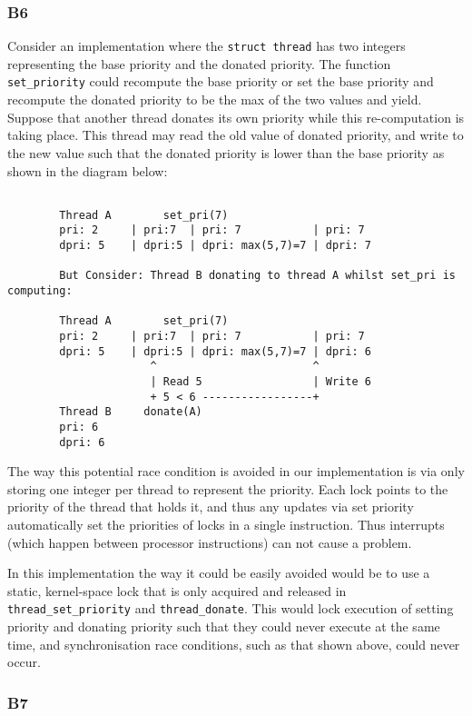 \documentclass[a4wide, 11pt]{article}
\newcommand{\tx}{\texttt}
\begin{document}
\subsubsection{B6}
Consider an implementation where the \tx{struct thread} has two integers representing the base priority and the donated priority. The function \tx{set\_priority} could recompute the base priority or set the base priority and recompute the donated priority to be the max of the two values and yield. Suppose that another thread donates its own priority while this re-computation is taking place. This thread may read the old value of donated priority, and write to the new value such that the donated priority is lower than the base priority as shown in the diagram below:
\begin{verbatim}

        Thread A        set_pri(7)
        pri: 2     | pri:7  | pri: 7           | pri: 7
        dpri: 5    | dpri:5 | dpri: max(5,7)=7 | dpri: 7

        But Consider: Thread B donating to thread A whilst set_pri is computing: 

        Thread A        set_pri(7)
        pri: 2     | pri:7  | pri: 7           | pri: 7
        dpri: 5    | dpri:5 | dpri: max(5,7)=7 | dpri: 6
                      ^                        ^
                      | Read 5                 | Write 6
                      + 5 < 6 -----------------+
        Thread B     donate(A)
        pri: 6
        dpri: 6 
\end{verbatim}    

The way this potential race condition is avoided in our implementation is via only storing one integer per thread to represent the priority. Each lock points to the priority of the thread that holds it, and thus any updates via set priority automatically set the priorities of locks in a single instruction. Thus interrupts (which happen between processor instructions) can not cause a problem.

In this implementation the way it could be easily avoided would be to use a static, kernel-space lock that is only acquired and released in \tx{thread\_set\_priority} and \tx{thread\_donate}. This would lock execution of setting priority and donating priority such that they could never execute at the same time, and synchronisation race conditions, such as that shown above, could never occur.

\subsubsection{B7} 
\end{document}
